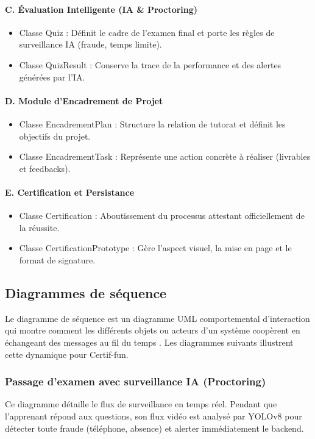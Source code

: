 \paragraph{C. Évaluation Intelligente (IA \& Proctoring)}
\begin{itemize}
    \item Classe Quiz : Définit le cadre de l'examen final et porte les règles de surveillance IA (fraude, temps limite).
    \item Classe QuizResult : Conserve la trace de la performance et des alertes générées par l'IA.
\end{itemize}

\paragraph{D. Module d'Encadrement de Projet}
\begin{itemize}
    \item Classe EncadrementPlan : Structure la relation de tutorat et définit les objectifs du projet.
    \item Classe EncadrementTask : Représente une action concrète à réaliser (livrables et feedbacks).
\end{itemize}

\paragraph{E. Certification et Persistance}
\begin{itemize}
    \item Classe Certification : Aboutissement du processus attestant officiellement de la réussite.
    \item Classe CertificationPrototype : Gère l'aspect visuel, la mise en page et le format de signature.
\end{itemize}

\subsection{Diagrammes de séquence}
Le diagramme de séquence est un diagramme UML comportemental d'interaction qui montre comment les différents objets ou acteurs d'un système coopèrent en échangeant des messages au fil du temps \cite{miro_sequence_diagram}. Les diagrammes suivants illustrent cette dynamique pour Certif-fun.

\subsubsection{Passage d'examen avec surveillance IA (Proctoring)}
Ce diagramme détaille le flux de surveillance en temps réel. Pendant que l'apprenant répond aux questions, son flux vidéo est analysé par YOLOv8 pour détecter toute fraude (téléphone, absence) et alerter immédiatement le backend.

